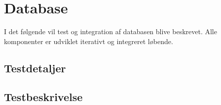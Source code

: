 \section{Database}\label{sec:testdatabase}
I det følgende vil test og integration af databasen blive beskrevet. Alle komponenter er udviklet iterativt og integreret løbende.

\subsection{Testdetaljer}



\subsection{Testbeskrivelse}
